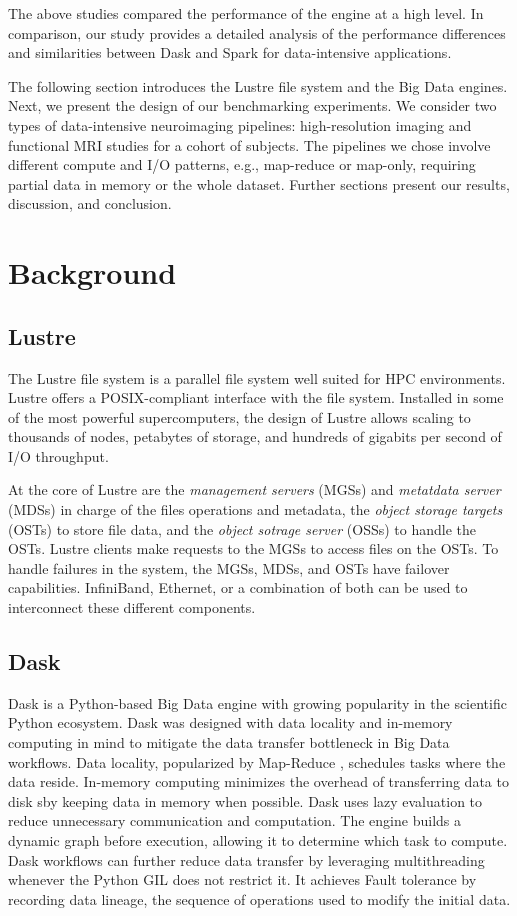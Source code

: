 \documentclass[conference]{IEEEtran}
\begin{document}
The above studies compared the performance of the engine at a high level.
In comparison, our study provides a detailed analysis of the performance differences and similarities between Dask and Spark for data-intensive applications.

The following section introduces the Lustre file system and the Big Data engines.
Next, we present the design of our benchmarking experiments.
We consider two types of data-intensive neuroimaging pipelines: high-resolution imaging and functional MRI studies for a cohort of subjects.
The pipelines we chose involve different compute and I/O patterns, e.g., map-reduce or map-only, requiring partial data in memory or the whole dataset.
Further sections present our results, discussion, and conclusion.


\section{Background}
\subsection{Lustre}
The Lustre file system is a parallel file system well suited for HPC environments.
Lustre offers a POSIX-compliant interface with the file system.
Installed in some of the most powerful supercomputers, the design of Lustre allows
scaling to thousands of nodes, petabytes of storage, and hundreds of gigabits per second of I/O throughput.

At the core of Lustre are the \textit{management servers} (MGSs) and \textit{metatdata server} (MDSs) in charge of the files operations and metadata,
the \textit{object storage targets} (OSTs) to store file data, and the \textit{object sotrage server} (OSSs) to handle the OSTs.
Lustre clients make requests to the MGSs to access files on the OSTs.
To handle failures in the system, the MGSs, MDSs, and OSTs have failover capabilities.
InfiniBand, Ethernet, or a combination of both can be used to interconnect these different components.

\subsection{Dask}
Dask is a Python-based Big Data engine with growing popularity in the scientific Python ecosystem.
Dask was designed with data locality and in-memory computing in mind to mitigate the data transfer bottleneck in Big Data workflows.
Data locality, popularized by Map-Reduce \cite{dean2008mapreduce}, schedules tasks where the data reside.
In-memory computing minimizes the overhead of transferring data to disk sby keeping data in memory when possible.
Dask uses lazy evaluation to reduce unnecessary communication and computation.
The engine builds a dynamic graph before execution, allowing it to determine which task to compute.
Dask workflows can further reduce data transfer by leveraging multithreading whenever the Python GIL does not restrict it.
It achieves Fault tolerance by recording data lineage, the sequence of operations used to modify the initial data.
\end{document}
